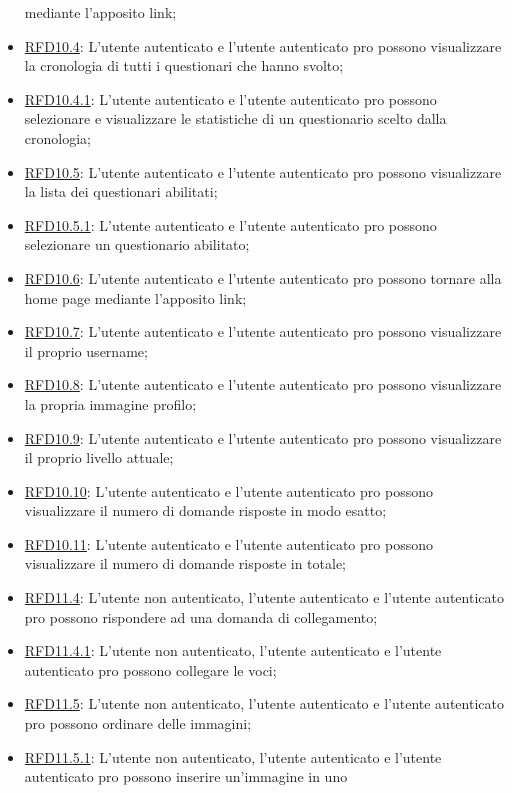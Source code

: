 \begin{itemize}
mediante l’apposito link;
\item \hyperlink{RFD10.4}{RFD10.4}: L’utente autenticato e l’utente
autenticato pro possono visualizzare la
cronologia di tutti i questionari che
hanno svolto;
\item \hyperlink{RFD10.4.1}{RFD10.4.1}: L’utente autenticato e l’utente
autenticato pro possono selezionare e
visualizzare le statistiche di un
questionario scelto dalla cronologia;
\item \hyperlink{RFD10.5}{RFD10.5}: L’utente autenticato e l’utente
autenticato pro possono visualizzare la
lista dei questionari abilitati;
\item \hyperlink{RFD10.5.1}{RFD10.5.1}: L’utente autenticato e l’utente
autenticato pro possono selezionare un
questionario abilitato;
\item \hyperlink{RFD10.6}{RFD10.6}: L’utente autenticato e l’utente
autenticato pro possono tornare alla
home page mediante l’apposito link;
\item \hyperlink{RFD10.7}{RFD10.7}: L’utente autenticato e l’utente
autenticato pro possono visualizzare il proprio username;
\item \hyperlink{RFD10.8}{RFD10.8}: L’utente autenticato e l’utente
autenticato pro possono visualizzare la propria immagine profilo;
\item \hyperlink{RFD10.9}{RFD10.9}: L’utente autenticato e l’utente
autenticato pro possono visualizzare il proprio livello attuale;
\item \hyperlink{RFD10.10}{RFD10.10}: L’utente autenticato e l’utente
autenticato pro possono visualizzare il numero di domande risposte in
modo esatto;
\item \hyperlink{RFD10.11}{RFD10.11}: L’utente autenticato e l’utente autenticato pro possono visualizzare il numero di domande risposte in totale;
\item \hyperlink{RFD11.4}{RFD11.4}: L’utente non autenticato, l’utente
autenticato e l’utente autenticato pro
possono rispondere ad una domanda di
collegamento;
\item \hyperlink{RFD11.4.1}{RFD11.4.1}: L’utente non autenticato, l’utente
autenticato e l’utente autenticato pro
possono collegare le voci;
\item \hyperlink{RFD11.5}{RFD11.5}: L’utente non autenticato, l’utente
autenticato e l’utente autenticato pro
possono ordinare delle immagini;
\item \hyperlink{RFD11.5.1}{RFD11.5.1}: L’utente non autenticato, l’utente
autenticato e l’utente autenticato pro
possono inserire un’immagine in uno

\end{itemize}
